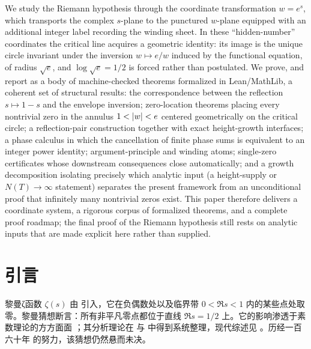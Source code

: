 \begin{frontmatter}
\begin{altabstract}
We study the Riemann hypothesis through the coordinate transformation $w=e^{s}$,
which transports the complex $s$-plane to the punctured $w$-plane equipped with
an additional integer label recording the winding sheet. In these
``hidden-number'' coordinates the critical line acquires a geometric identity:
its image is the unique circle invariant under the inversion $w\mapsto e/w$
induced by the functional equation, of radius $\sqrt{e}$, and
$\log\sqrt{e}=1/2$ is forced rather than postulated. We prove, and report as a
body of machine-checked theorems formalized in Lean/MathLib, a coherent set of
structural results: the correspondence between the reflection $s\mapsto 1-s$ and
the envelope inversion; zero-location theorems placing every nontrivial zero in
the annulus $1<\lvert w\rvert<e$ centered geometrically on the critical circle; a
reflection-pair construction together with exact height-growth interfaces; a
phase calculus in which the cancellation of finite phase sums is equivalent to
an integer power identity; argument-principle and winding atoms; single-zero
certificates whose downstream consequences close automatically; and a growth
decomposition isolating precisely which analytic input (a height-supply or
$N(T)\to\infty$ statement) separates the present framework from an unconditional
proof that infinitely many nontrivial zeros exist. This paper therefore delivers
a coordinate system, a rigorous corpus of formalized theorems, and a complete
proof roadmap; the final proof of the Riemann hypothesis still rests on
analytic inputs that are made explicit here rather than supplied.
\end{altabstract}

\begin{altkeywords}
\end{altkeywords}

\begin{AMSclass}
\end{AMSclass}
\end{frontmatter}

\section{引言}\label{sec:intro}

黎曼ζ函数 $\zeta(s)$ 由 \cite{Riemann1859} 引入，它在负偶数处以及临界带
$0<\Re s<1$ 内的某些点处取零。黎曼猜想断言：所有非平凡零点都位于直线
$\Re s=1/2$ 上。它的影响渗透于素数理论的方方面面
\citep{vonMangoldt1905,Hadamard1893}；其分析理论在 \citet{Titchmarsh1985} 与
\citet{Edwards1974} 中得到系统整理，现代综述见 \citet{Conrey2003}。历经一百六十年
的努力，该猜想仍然悬而未决。

